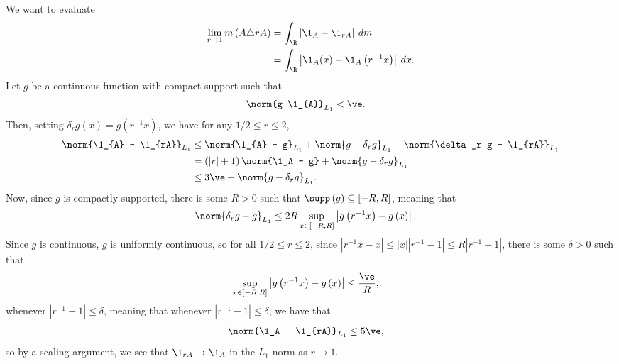 \documentclass[10pt]{mypackage}
\begin{document}
We want to evaluate
\begin{align*}
  \lim_{r\rightarrow 1} m\left( A\triangle rA \right) &= \int_{\R}^{} \left\vert \1_{A} - \1_{rA} \right\vert\:dm\\
                                                      &= \int_{\R}^{} \left\vert \1_{A}(x) - \1_{A}\left( r^{-1}x \right) \right\vert\:dx.
\end{align*}
Let $g$ be a continuous function with compact support such that
\begin{align*}
  \norm{g-\1_{A}}_{L_1} &< \ve.
\end{align*}
Then, setting $\delta_r g(x) = g\left( r^{-1}x \right)$, we have for any $1/2 \leq r \leq 2$,
\begin{align*}
  \norm{\1_{A} - \1_{rA}}_{L_1} &\leq \norm{\1_{A} - g}_{L_1} + \norm{g - \delta_r g}_{L_1} + \norm{\delta_r g - \1_{rA}}_{L_1}\\
                                &= \left( \left\vert r \right\vert + 1 \right)\norm{\1_A - g} + \norm{g-\delta_r g}_{L_1}\\
                                &\leq 3\ve + \norm{g-\delta_r g}_{L_1}.
\end{align*}
Now, since $g$ is compactly supported, there is some $R > 0$ such that $\supp\left( g \right) \subseteq \left[ -R,R \right]$, meaning that
\begin{align*}
  \norm{\delta_r g - g}_{L_1} &\leq 2R \sup_{x\in [-R,R]} \left\vert g\left( r^{-1}x \right) - g\left( x \right) \right\vert.
\end{align*}
Since $g$ is continuous, $g$ is uniformly continuous, so for all $1/2\leq r \leq 2$, since $\left\vert r^{-1} x - x \right\vert \leq \left\vert x \right\vert\left\vert r^{-1}-1 \right\vert \leq R\left\vert r^{-1}-1 \right\vert$, there is some $\delta > 0$ such that
\begin{align*}
  \sup_{x\in \left[ -R,R \right]}\left\vert g\left( r^{-1}x \right) - g\left( x \right) \right\vert &\leq \frac{\ve}{R},
\end{align*}
whenever $\left\vert r^{-1}-1 \right\vert \leq \delta$, meaning that whenever $\left\vert r^{-1}-1 \right\vert\leq \delta$, we have that
\begin{align*}
  \norm{\1_A - \1_{rA}}_{L_1} &\leq 5\ve,
\end{align*}
so by a scaling argument, we see that $\1_{rA} \rightarrow \1_A$ in the $L_1$ norm as $r\rightarrow 1$.
\end{document}
